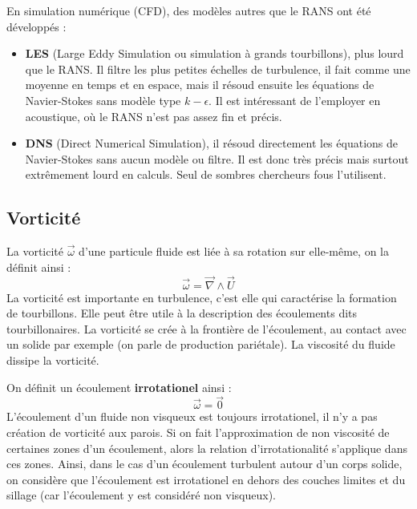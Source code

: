 En simulation numérique (CFD), des modèles autres que le RANS ont été développés :
%
\begin{itemize}
    \item \textbf{LES} (Large Eddy Simulation ou simulation à grands tourbillons), plus lourd que le RANS. Il filtre les plus petites échelles de turbulence, il fait comme une moyenne en temps et en espace, mais il résoud ensuite les équations de Navier-Stokes sans modèle type $k-\epsilon$. Il est intéressant de l'employer en acoustique, où le RANS n'est pas assez fin et précis.
    \item \textbf{DNS} (Direct Numerical Simulation), il résoud directement les équations de Navier-Stokes sans aucun modèle ou filtre. Il est donc très précis mais surtout extrêmement lourd en calculs. Seul de sombres chercheurs fous l'utilisent.
\end{itemize}

\subsection*{Vorticité}

La vorticité $\vec{\omega}$ d'une particule fluide est liée à sa rotation sur elle-même, on la définit ainsi :
%
\begin{equation}
    \vec{\omega} = \vec{\nabla} \wedge \vec{U}
\end{equation}
%
La vorticité est importante en turbulence, c'est elle qui caractérise la formation de tourbillons. Elle peut être utile à la description des écoulements dits tourbillonaires. La vorticité se crée à la frontière de l'écoulement, au contact avec un solide par exemple (on parle de production pariétale). La viscosité du fluide dissipe la vorticité.

On définit un écoulement \textbf{irrotationel} ainsi :
%
\begin{equation}
    \vec{\omega} = \vec{0}
\end{equation}
%
L'écoulement d'un fluide non visqueux est toujours irrotationel, il n'y a pas création de vorticité aux parois. Si on fait l'approximation de non viscosité de certaines zones d'un écoulement, alors la relation d'irrotationalité s'applique dans ces zones. Ainsi, dans le cas d'un écoulement turbulent autour d'un corps solide, on considère que l'écoulement est irrotationel en dehors des couches limites et du sillage (car l'écoulement y est considéré non visqueux).
